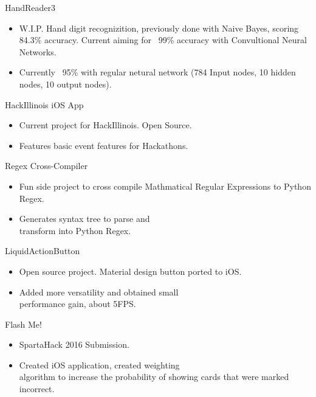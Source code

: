 \documentclass{tccv}
\begin{document}
\begin{projectlist}

  {HandReader3}
  \begin{itemize}
  \item W.I.P. Hand digit recognizition, previously done with Naive Bayes, scoring 84.3\% accuracy. Current aiming for ~99\% accuracy with Convultional Neural Networks.
  \item Currently ~95\% with regular netural network (784 Input nodes, 10 hidden nodes, 10 output nodes).
  \end{itemize}

  {HackIllinois iOS App}

  \begin{itemize}
  \item Current project for HackIllinois. Open Source.
  \item Features basic event features for Hackathons.
  \end{itemize}

  {Regex Cross-Compiler}
  \begin{itemize}
  \item Fun side project to cross compile Mathmatical Regular Expressions to Python Regex.
  \item Generates syntax tree to parse and \\
    transform into Python Regex.

  \end{itemize}
  {LiquidActionButton}
  \begin{itemize}
  \item Open source project. Material design button ported to iOS.
  \item Added more versatility and obtained small \\
    performance gain, about 5FPS.
  \end{itemize}

  {Flash Me!}
  \begin{itemize}
  \item SpartaHack 2016 Submission.
  \item Created iOS application, created weighting \\
    algorithm to increase the probability of showing cards that were marked incorrect.
  \end{itemize}


\end{projectlist}
\end{document}

